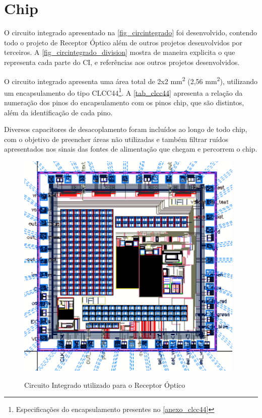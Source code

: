 \section{Chip}

O circuito integrado apresentado na \autoref{fig_circintegrado} foi desenvolvido, contendo todo o projeto de Receptor Óptico além de outros projetos desenvolvidos por terceiros. A \autoref{fig_circintegrado_division} mostra de maneira explicita o que representa cada parte do CI, e referências aos outros projetos desenvolvidos.

O circuito integrado apresenta uma área total de 2x2 mm\textsuperscript{2} (2,56 mm\textsuperscript{2}), utilizando um encapsulamento do tipo CLCC44\footnote{Especificações do encapsulamento presentes no \autoref{anexo_clcc44}}. A \autoref{tab_clcc44} apresenta a relação da numeração dos pinos do encapsulamento com os pinos chip, que são distintos, além da identificação de cada pino.

Diversos capacitores de desacoplamento foram incluídos ao longo de todo chip, com o objetivo de preencher áreas não utilizadas e também filtrar ruídos apresentados nos sinais das fontes de alimentação que chegam e percorrem o chip. 

\begin{figure}[!h]
 \centering
    \caption{Circuito Integrado utilizado para o Receptor Óptico} 
    \includegraphics[scale=0.5]{Projeto/Layout/Imagens/CircuitoIntegrado.png}
    \label{fig_circintegrado}
\end{figure}

